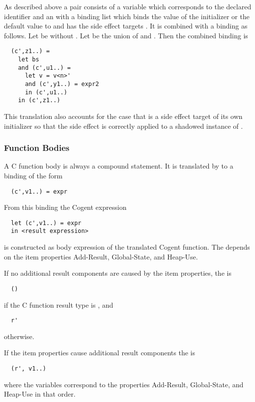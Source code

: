As described above a pair consists of a variable  which corresponds to the declared identifier and an 
with a binding list  which binds the value of the initializer or the default value to  and has the
side effect targets . It is combined with a binding  as follows.
Let  be  without . Let  be the union of  and . Then the
combined binding is
\begin{verbatim}
  (c',z1..) = 
    let bs
    and (c',u1..) = 
      let v = v<n>'
      and (c',y1..) = expr2
      in (c',u1..)
    in (c',z1..)
\end{verbatim}
This translation also accounts for the case that  is a side effect target of its own initializer so that the side effect is
correctly applied to a shadowed instance of .

\subsubsection{Function Bodies}

A C function body is always a compound statement. It is translated by  to a 
binding of the form
\begin{verbatim}
  (c',v1..) = expr
\end{verbatim}

From this binding the Cogent expression
\begin{verbatim}
  let (c',v1..) = expr
  in <result expression>
\end{verbatim}
is constructed as body expression of the translated Cogent function. The  depends on the item properties 
Add-Result, Global-State, and Heap-Use.

If no additional result components are caused by the item properties, the  is
\begin{verbatim}
  ()
\end{verbatim}
if the C function result type is , and
\begin{verbatim}
  r'
\end{verbatim}
otherwise.

If the item properties cause additional result components the  is
\begin{verbatim}
  (r', v1..)
\end{verbatim}
where the variables  correspond to the properties Add-Result, Global-State, and Heap-Use in that order.

